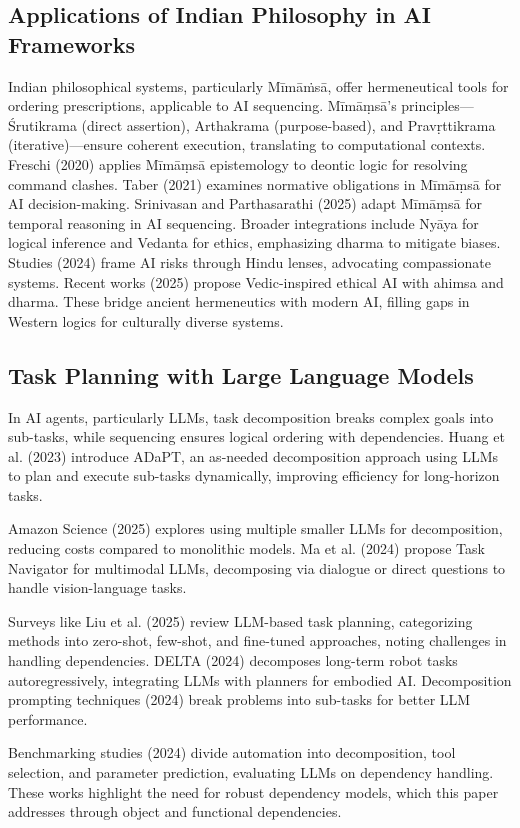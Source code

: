 \documentclass[a4paper,11pt]{lmcs}
\newcommand{\mimamsa}{M\={i}m\={a}\.ms\={a}}
\begin{document}
\subsection{Applications of Indian Philosophy in AI Frameworks}
Indian philosophical systems, particularly \mimamsa, offer hermeneutical tools for ordering prescriptions, applicable to AI sequencing. Mīmāṃsā's principles—Śrutikrama (direct assertion), Arthakrama (purpose-based), and Pravṛttikrama (iterative)—ensure coherent execution, translating to computational contexts.
Freschi (2020) applies Mīmāṃsā epistemology to deontic logic for resolving command clashes. Taber (2021) examines normative obligations in Mīmāṃsā for AI decision-making. Srinivasan and Parthasarathi (2025) adapt Mīmāṃsā for temporal reasoning in AI sequencing.
Broader integrations include Nyāya for logical inference and Vedanta for ethics, emphasizing dharma to mitigate biases. Studies (2024) frame AI risks through Hindu lenses, advocating compassionate systems. Recent works (2025) propose Vedic-inspired ethical AI with ahimsa and dharma. These bridge ancient hermeneutics with modern AI, filling gaps in Western logics for culturally diverse systems.
\subsection{Task Planning with Large Language Models}

In AI agents, particularly LLMs, task decomposition breaks complex goals into sub-tasks, while sequencing ensures logical ordering with dependencies. Huang et al. (2023) introduce ADaPT, an as-needed decomposition approach using LLMs to plan and execute sub-tasks dynamically, improving efficiency for long-horizon tasks.

Amazon Science (2025) explores using multiple smaller LLMs for decomposition, reducing costs compared to monolithic models. Ma et al. (2024) propose Task Navigator for multimodal LLMs, decomposing via dialogue or direct questions to handle vision-language tasks.

Surveys like Liu et al. (2025) review LLM-based task planning, categorizing methods into zero-shot, few-shot, and fine-tuned approaches, noting challenges in handling dependencies. DELTA (2024) decomposes long-term robot tasks autoregressively, integrating LLMs with planners for embodied AI. Decomposition prompting techniques (2024) break problems into sub-tasks for better LLM performance.

Benchmarking studies (2024) divide automation into decomposition, tool selection, and parameter prediction, evaluating LLMs on dependency handling. These works highlight the need for robust dependency models, which this paper addresses through object and functional dependencies.
\end{document}
